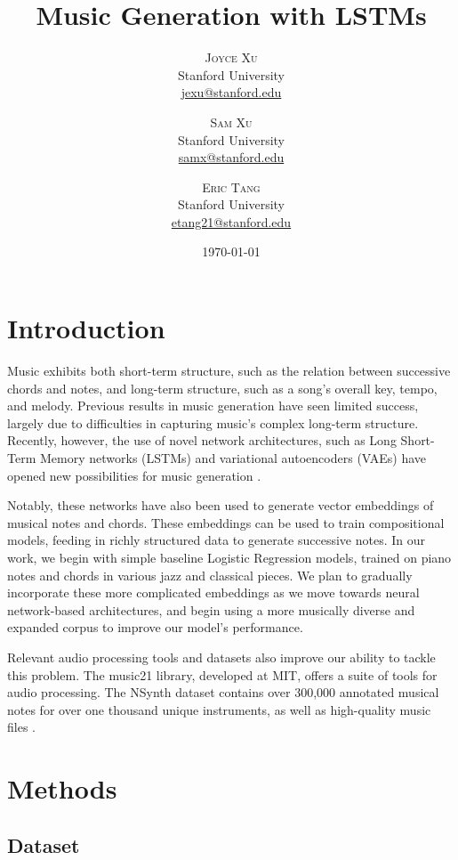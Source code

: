 \documentclass[twoside,twocolumn]{article}
\title{Music Generation with LSTMs} %
\author{%
\textsc{Joyce Xu} \\[1ex] %
\normalsize Stanford University \\ %
\normalsize \href{mailto:jexu@stanford.edu}{jexu@stanford.edu} %
\and %
\textsc{Sam Xu} \\[1ex] %
\normalsize Stanford University \\ %
\normalsize \href{mailto:samx}{samx@stanford.edu} %
\and %
\textsc{Eric Tang} \\[1ex] %
\normalsize Stanford University \\ %
\normalsize \href{mailto:etang21@stanford.edu}{etang21@stanford.edu} %
}
\date{\today} %
\begin{document}
\maketitle


\section{Introduction}

Music exhibits both short-term structure, such as the relation between successive chords and notes, and long-term structure, such as a song's overall key, tempo, and melody. Previous results in music generation have seen limited success, largely due to difficulties in capturing music's complex long-term structure. Recently, however, the use of novel network architectures, such as Long Short-Term Memory networks (LSTMs) and variational autoencoders (VAEs) have opened new possibilities for music generation \cite{lstm-vae}.

Notably, these networks have also been used to generate vector embeddings of musical notes and chords. These embeddings can be used to train compositional models, feeding in richly structured data to generate successive notes. In our work, we begin with simple baseline Logistic Regression models, trained on piano notes and chords in various jazz and classical pieces. We plan to gradually incorporate these more complicated embeddings as we move towards neural network-based architectures, and begin using a more musically diverse and expanded corpus to improve our model's performance.

Relevant audio processing tools and datasets also improve our ability to tackle this problem. The music21 library, developed at MIT, offers a suite of tools for audio processing. The NSynth dataset contains over 300,000 annotated musical notes for over one thousand unique instruments, as well as high-quality music files \cite{NSynth}. 



\section{Methods}

\subsection{Dataset}
\end{document}
